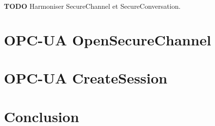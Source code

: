 \documentclass{llncs}
\newcommand{\TODO}{{\color{red}\bf TODO}\xspace}
\newcommand{\opcua}{OPC-UA\xspace}
\begin{document}
\TODO Harmoniser SecureChannel et SecureConversation.

\section{\opcua OpenSecureChannel}\label{sec:opcuasc}


\section{\opcua CreateSession}\label{sec:opcuacs}


%
%

\section{Conclusion}




\end{document}

